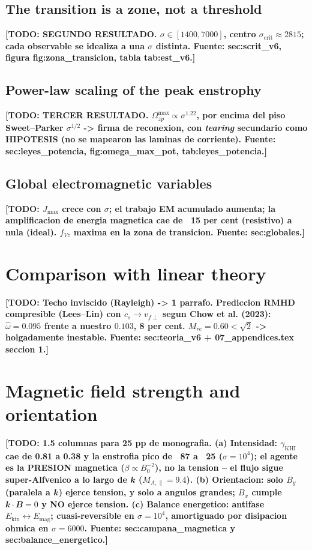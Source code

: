 \documentclass[fleqn,usenatbib]{mnras}
\newcommand{\gKHI}{\gamma_{\mathrm{KHI}}}
\newcommand{\scrit}{\sigma_{\mathrm{crit}}}
\newcommand{\Omaxzp}{\Omega_{zp}^{\max}}
\newcommand{\B}{\mathbfit{B}}      %
\newcommand{\kvec}{\mathbfit{k}}
\newcommand{\todo}[1]{\textbf{[TODO: #1]}}
\begin{document}
\subsection{The transition is a zone, not a threshold}
\label{sec:zone}
\todo{SEGUNDO RESULTADO. $\sigma\in[1400,7000]$, centro $\scrit\approx2815$;
cada observable se idealiza a una $\sigma$ distinta. Fuente: sec:scrit\_v6,
figura fig:zona\_transicion, tabla tab:est\_v6.}

\subsection{Power-law scaling of the peak enstrophy}
\label{sec:powerlaw}
\todo{TERCER RESULTADO. $\Omaxzp\propto\sigma^{1.22}$, por encima del piso
Sweet--Parker $\sigma^{1/2}$ -> firma de reconexion, con \emph{tearing}
secundario como HIPOTESIS (no se mapearon las laminas de corriente).
Fuente: sec:leyes\_potencia, fig:omega\_max\_pot, tab:leyes\_potencia.}

\subsection{Global electromagnetic variables}
\label{sec:global}
\todo{$J_{\max}$ crece con $\sigma$; el trabajo EM acumulado aumenta; la
amplificacion de energia magnetica cae de ~15 per cent (resistivo) a nula
(ideal). $f_{Vz}$ maxima en la zona de transicion. Fuente: sec:globales.}

\section{Comparison with linear theory}
\label{sec:theory}

\todo{Techo inviscido (Rayleigh) -> 1 parrafo. Prediccion RMHD compresible
(Lees--Lin) con $c_s\to v_{f\perp}$ segun Chow et al. (2023):
$\hat\omega=0.095$ frente a nuestro $0.103$, 8 per cent.
$M_{re}=0.60<\sqrt2$ -> holgadamente inestable.
Fuente: sec:teoria\_v6 + 07\_appendices.tex seccion 1.}

\section{Magnetic field strength and orientation}
\label{sec:magnetic}

\todo{1.5 columnas para 25 pp de monografia. (a) Intensidad: $\gKHI$ cae de
0.81 a 0.38 y la enstrofia pico de ~87 a ~25 ($\sigma=10^4$); el agente es la
PRESION magnetica ($\beta\propto B_0^{-2}$), no la tension -- el flujo sigue
super-Alfvenico a lo largo de $\kvec$ ($M_{A,\parallel}=9.4$). (b) Orientacion:
solo $B_y$ (paralela a $\kvec$) ejerce tension, y solo a angulos grandes; $B_x$
cumple $\kvec\cdot\B=0$ y NO ejerce tension. (c) Balance energetico: antifase
$E_{\mathrm{kin}}\leftrightarrow E_{\mathrm{mag}}$; cuasi-reversible en
$\sigma=10^4$, amortiguado por disipacion ohmica en $\sigma=6000$.
Fuente: sec:campana\_magnetica y sec:balance\_energetico.}
\end{document}
